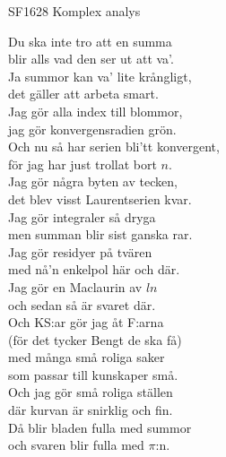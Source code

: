 \documentclass[a6paper,10pt]{article}
\begin{document}
\setlength{\oddsidemargin}{-0.47in}
\noindent
\begin{center}
\footnotesize SF1628 Komplex analys\\
\end{center}
\begin{lyrics}
Du ska inte tro att en summa \\
blir alls vad den ser ut att va'. \\
Ja summor kan va' lite krångligt, \\
det gäller att arbeta smart. 
\vspace{5pt} \\
Jag gör alla index till blommor, \\
jag gör konvergensradien grön. \\
Och nu så har serien bli'tt konvergent, \\
för jag har just trollat bort $n$. 
\vspace{5pt} \\
Jag gör några byten av tecken, \\
det blev visst Laurentserien kvar. \\
Jag gör integraler så dryga \\
men summan blir sist ganska rar. 
\vspace{5pt} \\
Jag gör residyer på tvären \\
med nå'n enkelpol här och där. \\
Jag gör en Maclaurin av $ln$ \\
och sedan så är svaret där. 
\vspace{5pt} \\
Och KS:ar gör jag åt F:arna \\
(för det tycker Bengt de ska få) \\
med många små roliga saker \\
som passar till kunskaper små. 
\vspace{5pt} \\
Och jag gör små roliga ställen \\
där kurvan är snirklig och fin. \\
Då blir bladen fulla med summor \\
och svaren blir fulla med $\pi$:n.
\end{lyrics}
\end{document}
